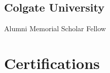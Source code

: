 \documentclass[letterpaper]{deedy-resume} %
\begin{document}
\begin{minipage}[t]{0.33\textwidth}
\subsection{Colgate University}
Alumni Memorial Scholar Fellow \\

\sectionspace %


\section{Certifications}

 \\

\sectionspace %










\end{minipage}
\end{document}
